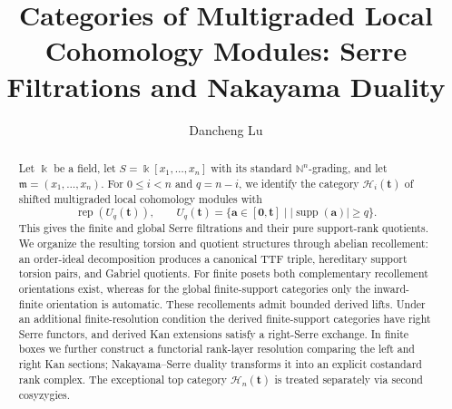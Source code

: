 \documentclass[12pt,reqno]{amsart}
\theoremstyle{definition}
\theoremstyle{remark}
\newcommand{\Rep}{\operatorname{rep}}
\begin{document}
\title{Categories of Multigraded Local Cohomology Modules: Serre Filtrations and Nakayama Duality}
\author{Dancheng Lu}
\address{School of Mathematical Sciences, Soochow University, Suzhou 215006, P.~R.~China}

\begin{abstract}
Let $\Bbbk$ be a field, let $S=\Bbbk[x_1,\ldots,x_n]$ with its standard
$\mathbb N^n$-grading, and let $\mathfrak m=(x_1,\ldots,x_n)$.  For
$0\le i<n$ and $q=n-i$, we identify the category
$\mathcal H_i(\mathbf t)$ of shifted multigraded local cohomology modules with
\[
\Rep(U_q(\mathbf t)),\qquad
U_q(\mathbf t)=\{\mathbf a\in[\mathbf0,\mathbf t]\mid
|\operatorname{supp}(\mathbf a)|\ge q\}.
\]
This gives the finite and global Serre filtrations and their pure
support-rank quotients.  We organize the resulting torsion and quotient
structures through abelian recollement: an order-ideal decomposition produces
a canonical TTF triple, hereditary support torsion pairs, and Gabriel
quotients.  For finite posets both complementary recollement orientations
exist, whereas for the global finite-support categories only the
inward-finite orientation is automatic.  These recollements admit bounded
derived lifts.  Under an additional finite-resolution condition the derived
finite-support categories have right Serre functors, and derived Kan
extensions satisfy a right-Serre exchange.  In finite boxes we further
construct a functorial rank-layer resolution comparing the left and right Kan
sections; Nakayama--Serre duality transforms it into an explicit costandard
rank complex.  The exceptional top category $\mathcal H_n(\mathbf t)$ is
treated separately via second cosyzygies.
\end{abstract}


\maketitle
\end{document}
